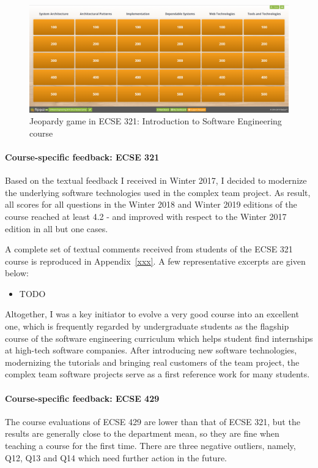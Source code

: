 \documentclass[a4paper,11pt]{article}
\begin{document}
\begin{figure}[htb]
\centering
\includegraphics[width=.8\textwidth]{figures/FlipQuiz}
\caption{Jeopardy game in ECSE 321: Introduction to Software Engineering course}
\label{fig:jeopardy-ecse321}
\end{figure}



\paragraph{Course-specific feedback: ECSE 321}
Based on the textual feedback I received in Winter 2017, I decided to modernize the underlying software technologies used in the complex team project. As result, all scores for all questions in the Winter 2018 and Winter 2019 editions of the course reached at least 4.2 - and improved with respect to the Winter 2017 edition in all but one cases. 

A complete set of textual comments received from students of the ECSE 321 course is reproduced in Appendix~\ref{xxx}. A few representative excerpts are given below:
\begin{itemize}
\item TODO
\end{itemize}

Altogether, I was a key initiator to evolve a very good course into an excellent one, which is frequently regarded by undergraduate students as the flagship course of the software engineering curriculum which helps student find internships at high-tech software companies. After introducing new software technologies, modernizing the tutorials and bringing real customers of the team project, the complex team software projects serve as a first reference work for many students. 

\paragraph{Course-specific feedback: ECSE 429}
The course evaluations of ECSE 429 are lower than that of ECSE 321, but the results are generally close to the department mean, so they are fine when teaching a course for the first time. There are three negative outliers, namely, Q12, Q13 and Q14 which need further action in the future. 
\end{document}

